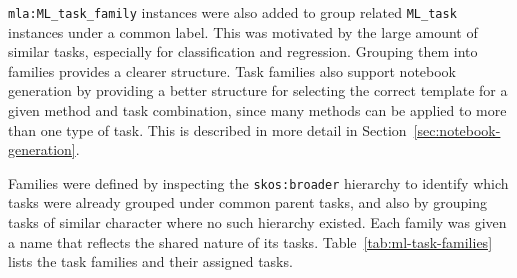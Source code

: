 \texttt{mla:ML\_task\_family} instances were also added to group related 
\texttt{ML\_task} instances under a common label. This was motivated by
the large amount of similar tasks, especially for classification and regression. 
Grouping them into families provides 
a clearer structure. Task families also support notebook 
generation by providing a better structure for selecting the correct 
template for a given method and task combination, since many methods 
can be applied to more than one type of task. This is described in 
more detail in Section~\ref{sec:notebook-generation}.

Families were defined by inspecting the \texttt{skos:broader} 
hierarchy to identify which tasks were already grouped under common 
parent tasks, and also by grouping tasks of similar character where no 
such hierarchy existed. Each family was given a name that reflects 
the shared nature of its tasks.
Table~\ref{tab:ml-task-families} lists the task families and their 
assigned tasks.

